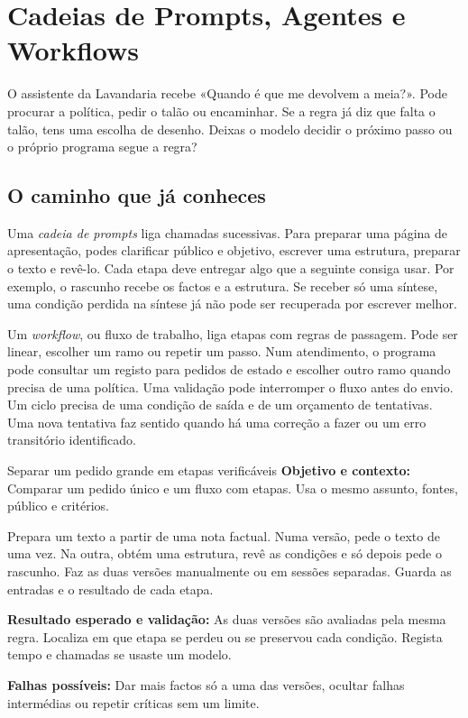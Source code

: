 \chapter{Cadeias de Prompts, Agentes e Workflows}
\label{ch:agentes}

\ficcao O assistente da Lavandaria recebe «Quando é que me devolvem a meia?». Pode procurar a política, pedir o talão ou encaminhar. Se a regra já diz que falta o talão, tens uma escolha de desenho. Deixas o modelo decidir o próximo passo ou o próprio programa segue a regra?

\section{O caminho que já conheces}

Uma \emph{cadeia de prompts} liga chamadas sucessivas. Para preparar uma página de apresentação, podes clarificar público e objetivo, escrever uma estrutura, preparar o texto e revê-lo. Cada etapa deve entregar algo que a seguinte consiga usar. Por exemplo, o rascunho recebe os factos e a estrutura. Se receber só uma síntese, uma condição perdida na síntese já não pode ser recuperada por escrever melhor.

Um \emph{workflow}, ou fluxo de trabalho, liga etapas com regras de passagem. Pode ser linear, escolher um ramo ou repetir um passo. Num atendimento, o programa pode consultar um registo para pedidos de estado e escolher outro ramo quando precisa de uma política. Uma validação pode interromper o fluxo antes do envio. Um ciclo precisa de uma condição de saída e de um orçamento de tentativas. Uma nova tentativa faz sentido quando há uma correção a fazer ou um erro transitório identificado.

\begin{promptlabbox}{Separar um pedido grande em etapas verificáveis}
\textbf{Objetivo e contexto:} Comparar um pedido único e um fluxo com etapas. Usa o mesmo assunto, fontes, público e critérios.

Prepara um texto a partir de uma nota factual. Numa versão, pede o texto de uma vez. Na outra, obtém uma estrutura, revê as condições e só depois pede o rascunho. Faz as duas versões manualmente ou em sessões separadas. Guarda as entradas e o resultado de cada etapa.

\textbf{Resultado esperado e validação:} As duas versões são avaliadas pela mesma regra. Localiza em que etapa se perdeu ou se preservou cada condição. Regista tempo e chamadas se usaste um modelo.

\textbf{Falhas possíveis:} Dar mais factos só a uma das versões, ocultar falhas intermédias ou repetir críticas sem um limite.
\end{promptlabbox}

